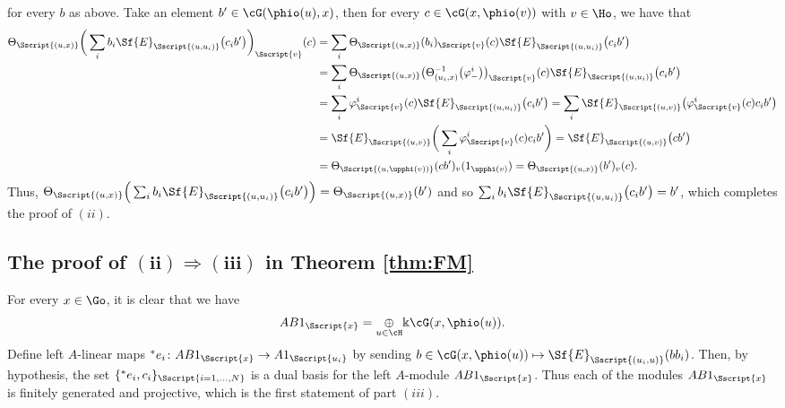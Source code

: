 for every $b$ as above. Take an element $b' \in \cG(\phio(u), x)$, then for every $c \in \cG(x,\phio(v))$ with $v \in \Ho$, we have that
\begin{align*}
\Theta_{\Sscript{(u, x)}} \bigg( \sum_{i} b_{i} \Sf{E}_{\Sscript{(u, u_{i})}} \big( c_{i} b'\big)\bigg)_{\Sscript{v}}(c) &= \sum_{i} \Theta_{\Sscript{(u, x
)}}(b_{i})_{\Sscript{v}}(c) \Sf{E}_{\Sscript{(u, u_{i})}} \big(c_{i} b'\big) \\
 &= \sum_{i} \Theta_{\Sscript{(u, x )}}\big(\Theta_{(u_{i}, x)}^{-1}\big( \varphi^{i}_{-}\big)\big)_{\Sscript{v}}(c) \Sf{E}_{\Sscript{(u, u_{i})}} \big( c_{i} b'\big) \\
&= \sum_{i} \varphi^{i}_{\Sscript{v}}(c) \Sf{E}_{\Sscript{(u,u_{i})}} \big( c_{i} b'\big) = \sum_{i}\Sf{E}_{\Sscript{(u, v)}}\big( \varphi^{i}_{\Sscript{v}}(c) c_{i}b'\big)\\
&= \Sf{E}_{\Sscript{(u, v)}} \bigg( \sum_{i}\varphi^{i}_{\Sscript{v}}(c) c_{i} b'\bigg) =\Sf{E}_{\Sscript{(u, v)}} \big( cb'\big) \\
&=\Theta_{\Sscript{(u,\upphi(v))}}(cb'){}_{v}(1_{\upphi(v)})= \Theta_{\Sscript{(u,x)}}(b'){}_{v}(c).
\end{align*}
Thus, $\Theta_{\Sscript{(u, x)}} \Big( \sum_{i} b_{i} \Sf{E}_{\Sscript{(u, u_{i})}} \big( c_{i} b'\big) \Big) = \Theta_{\Sscript{(u,x)}}(b')$ and so $\sum_{i} b_{i} \Sf{E}_{\Sscript{(u, u_{i})}} \big( c_{i} b'\big) = b'$, which completes the proof of $(ii)$. \QEDA

\subsection[The proof of $(ii) \Rightarrow (iii)$ in Theorem \ref{thm:FM}]{The proof of $\boldsymbol{(ii) \Rightarrow (iii)}$ in Theorem \ref{thm:FM}}\label{sssec:II-III}
For every $x \in \Go$, it is clear that we have
\begin{gather*}
AB1_{\Sscript{x}}=\underset{u \in \cH}{\oplus} \Bbbk \cG(x, \phio(u)).
\end{gather*}
Define left $A$-linear maps ${}^{*}e_{i}\colon AB1_{\Sscript{x}} \to A1_{\Sscript{u_{i}}}$ by sending $ b \in \cG(x,\phio(u)) \mapsto \Sf{E}_{\Sscript{(u_{i}, u)}}(bb_{i})$. Then, by hypothesis, the set $\{{}^{*}e_{i}, c_{i}\}_{\Sscript{i=1, \dots, N}}$ is a dual basis for the left $A$-module $AB1_{\Sscript{x}}$. Thus each of the modules $AB1_{\Sscript{x}}$ is finitely generated and projective, which is the first statement of part $(iii)$.

